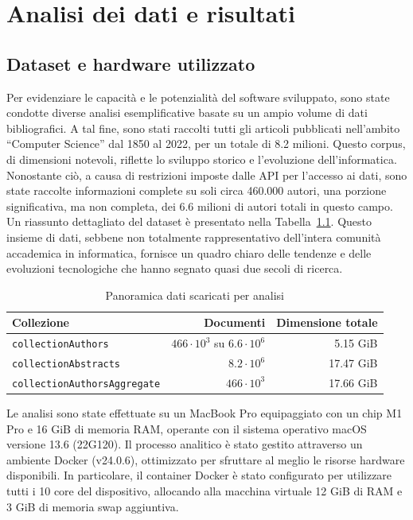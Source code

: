 \chapter{Analisi dei dati e risultati}
\section{Dataset e hardware utilizzato}

Per evidenziare le capacità e le potenzialità del software sviluppato, sono state condotte diverse analisi esemplificative basate su un ampio volume di dati bibliografici. A tal fine, sono stati raccolti tutti gli articoli pubblicati nell'ambito ``Computer Science'' dal 1850 al 2022, per un totale di 8.2 milioni. Questo corpus, di dimensioni notevoli, riflette lo sviluppo storico e l'evoluzione dell'informatica. Nonostante ciò, a causa di restrizioni imposte dalle API per l'accesso ai dati, sono state raccolte informazioni complete su soli circa 460.000 autori, una porzione significativa, ma non completa, dei 6.6 milioni di autori totali in questo campo. Un riassunto dettagliato del dataset è presentato nella Tabella~\ref{tab:overview_dataset}.
Questo insieme di dati, sebbene non totalmente rappresentativo dell'intera comunità accademica in informatica, fornisce un quadro chiaro delle tendenze e delle evoluzioni tecnologiche che hanno segnato quasi due secoli di ricerca.

\begin{table}[ht]
    \centering
    \begin{tabular}{|l|r|r|}
        \hline
        \textbf{Collezione} & \textbf{Documenti}  & \textbf{Dimensione totale} \\
        \hline
        \texttt{collectionAuthors} & $466\cdot10^3$ su $6.6\cdot10^6$ &  5.15 GiB \\
        \hline
        \texttt{collectionAbstracts} & $8.2\cdot10^6$ & 17.47 GiB \\
        \hline
        \texttt{collectionAuthorsAggregate} & $466\cdot10^3$ & 17.66 GiB \\
        \hline
    \end{tabular}
    \caption{Panoramica dati scaricati per analisi}
    \label{tab:overview_dataset}
\end{table}

Le analisi sono state effettuate su un MacBook Pro equipaggiato con un chip M1 Pro e 16 GiB di memoria RAM, operante con il sistema operativo macOS versione 13.6 (22G120). Il processo analitico è stato gestito attraverso un ambiente Docker (v24.0.6), ottimizzato per sfruttare al meglio le risorse hardware disponibili. In particolare, il container Docker è stato configurato per utilizzare tutti i 10 core del dispositivo, allocando alla macchina virtuale 12 GiB di RAM e 3 GiB di memoria swap aggiuntiva.

